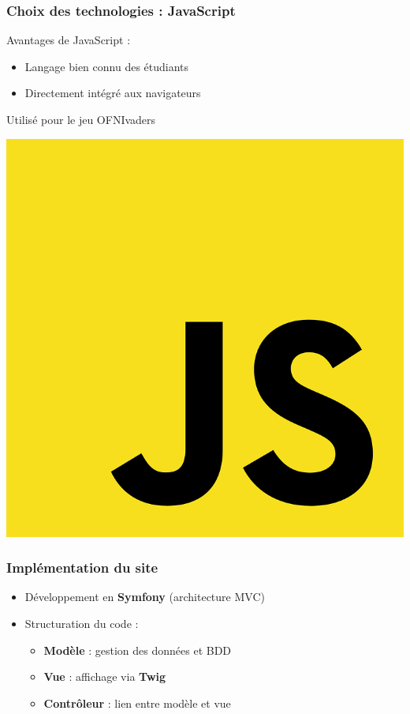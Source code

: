\begin{frame}
    \frametitle{Choix des technologies : JavaScript}

    \begin{minipage}{0.48\textwidth}
        \centering
	Avantages de JavaScript : 
	\begin{itemize}
	    \item Langage bien connu des étudiants
	    \item Directement intégré aux navigateurs
	\end{itemize}
	\bigskip
	Utilisé pour le jeu OFNIvaders
    \end{minipage}
    \hfill
    \begin{minipage}{0.48\textwidth}
        \centering
        \includegraphics[width=\linewidth]{pictures/javascript.png}
    \end{minipage}
    

\end{frame}


\begin{frame}
    \frametitle{Implémentation du site}

    \begin{itemize}
        \item Développement en \textbf{Symfony} (architecture MVC)
        \item Structuration du code :
              \begin{itemize}
                \item \textbf{Modèle} : gestion des données et BDD
                \item \textbf{Vue} : affichage via \textbf{Twig}
                \item \textbf{Contrôleur} : lien entre modèle et vue
              \end{itemize}
    \end{itemize}
\end{frame}

